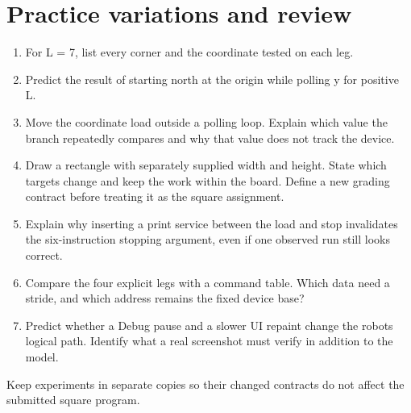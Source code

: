 \section{Practice variations and
  review}\label{006-marsbot-square-x-practice-practice-variations-and-review}

\begin{enumerate}
  \def\labelenumi{\arabic{enumi}.}
  \tightlist
  \item
        For L = 7, list every corner and the coordinate tested on each leg.
  \item
        Predict the result of starting north at the origin while polling y for
        positive L.
  \item
        Move the coordinate load outside a polling loop. Explain which value
        the branch repeatedly compares and why that value does not track the
        device.
  \item
        Draw a rectangle with separately supplied width and height. State
        which targets change and keep the work within the board. Define a new
        grading contract before treating it as the square assignment.
  \item
        Explain why inserting a print service between the load and stop
        invalidates the six-instruction stopping argument, even if one
        observed run still looks correct.
  \item
        Compare the four explicit legs with a command table. Which data need a
        stride, and which address remains the fixed device base?
  \item
        Predict whether a Debug pause and a slower UI repaint change the
        robot\textquotesingle s logical path. Identify what a real screenshot
        must verify in addition to the model.
\end{enumerate}

Keep experiments in separate copies so their changed contracts do not
affect the submitted square program.

